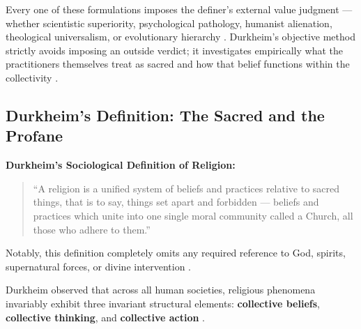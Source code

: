 \begin{CriticalPoint}
Every one of these formulations imposes the definer's external value judgment --- whether scientistic superiority, psychological pathology, humanist alienation, theological universalism, or evolutionary hierarchy . Durkheim's objective method strictly avoids imposing an outside verdict; it investigates empirically what the practitioners themselves treat as sacred and how that belief functions within the collectivity .
\end{CriticalPoint}

\subsection{Durkheim's Definition: The Sacred and the Profane}

\begin{KeyConcept}
\textbf{Durkheim's Sociological Definition of Religion:}
\begin{quote}
``A religion is a unified system of beliefs and practices relative to sacred things, that is to say, things set apart and forbidden --- beliefs and practices which unite into one single moral community called a Church, all those who adhere to them.'' 
\end{quote}
Notably, this definition completely omits any required reference to God, spirits, supernatural forces, or divine intervention .
\end{KeyConcept}

Durkheim observed that across all human societies, religious phenomena invariably exhibit three invariant structural elements: \textbf{collective beliefs}, \textbf{collective thinking}, and \textbf{collective action} .

